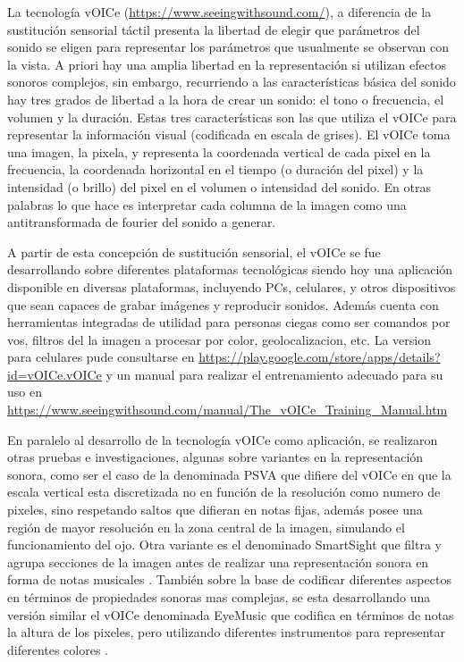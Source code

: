 \documentclass{article}
\begin{document}
    La tecnología vOICe (\url{https://www.seeingwithsound.com/}), a diferencia de la sustitución sensorial táctil presenta la libertad de elegir que parámetros del sonido se eligen para representar los parámetros que usualmente se observan con la vista. A priori hay una amplia libertad en la representación si utilizan efectos sonoros complejos, sin embargo, recurriendo a las características básica del sonido hay tres grados de libertad a la hora de crear un sonido: el tono o frecuencia, el volumen y la duración. Estas tres características son las que utiliza el vOICe para representar la información visual (codificada en escala de grises). El vOICe toma una imagen, la pixela, y representa la coordenada vertical de cada pixel en la frecuencia, la coordenada horizontal en el tiempo (o duración del pixel) y la intensidad (o brillo) del pixel en el volumen o intensidad del sonido. En otras palabras lo que hace es interpretar cada columna de la imagen como una antitransformada de fourier del sonido a generar. 
    
    A partir de esta concepción de sustitución sensorial, el vOICe se fue desarrollando sobre diferentes plataformas tecnológicas siendo hoy una aplicación disponible en diversas plataformas, incluyendo PCs, celulares, y otros dispositivos que sean capaces de grabar imágenes y reproducir sonidos. Además cuenta con herramientas integradas de utilidad para personas ciegas como ser comandos por vos, filtros del la imagen a procesar por color, geolocalizacion, etc. La version para celulares pude consultarse en \url{https://play.google.com/store/apps/details?id=vOICe.vOICe} y un manual para realizar el entrenamiento adecuado para su uso en \url {https://www.seeingwithsound.com/manual/The_vOICe_Training_Manual.htm} 
    
    En paralelo al desarrollo de la tecnología vOICe como aplicación, se realizaron otras pruebas e investigaciones, algunas sobre variantes en la representación sonora, como ser el caso de la denominada PSVA \cite{VoiceVariante1} que difiere del vOICe en que la escala vertical esta discretizada no en función de la resolución como numero de pixeles, sino respetando saltos que difieran en notas fijas, además posee una región de mayor resolución en la zona central de la imagen, simulando el funcionamiento del ojo. Otra variante es el denominado SmartSight que filtra y agrupa secciones de la imagen antes de realizar una representación sonora en forma de notas musicales \cite{VoiceVariantes2, VoiceVariantes3}. También sobre la base de codificar diferentes aspectos en términos de propiedades sonoras mas complejas, se esta desarrollando una versión similar el vOICe denominada EyeMusic que codifica en términos de notas la altura de los pixeles, pero utilizando diferentes instrumentos para representar diferentes colores \cite{VoiceVariantes4}.
    
\end{document}
